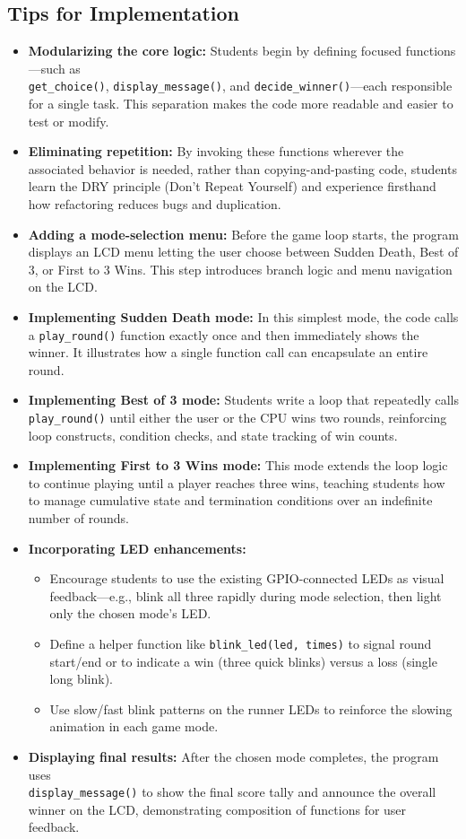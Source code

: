 \documentclass[a4paper,11pt]{article}
\begin{document}
\subsection*{Tips for Implementation}
\begin{itemize}
  \item \textbf{Modularizing the core logic:} Students begin by defining focused functions—such as \\ \texttt{get\_choice()}, \texttt{display\_message()}, and \texttt{decide\_winner()}—each responsible for a single task. This separation makes the code more readable and easier to test or modify.
  \item \textbf{Eliminating repetition:} By invoking these functions wherever the associated behavior is needed, rather than copying-and-pasting code, students learn the DRY principle (Don't Repeat Yourself) and experience firsthand how refactoring reduces bugs and duplication.
  \item \textbf{Adding a mode-selection menu:} Before the game loop starts, the program displays an LCD menu letting the user choose between Sudden Death, Best of 3, or First to 3 Wins. This step introduces branch logic and menu navigation on the LCD.
  \item \textbf{Implementing Sudden Death mode:} In this simplest mode, the code calls a \texttt{play\_round()} function exactly once and then immediately shows the winner. It illustrates how a single function call can encapsulate an entire round.
  \item \textbf{Implementing Best of 3 mode:} Students write a loop that repeatedly calls \texttt{play\_round()} until either the user or the CPU wins two rounds, reinforcing loop constructs, condition checks, and state tracking of win counts.
  \item \textbf{Implementing First to 3 Wins mode:} This mode extends the loop logic to continue playing until a player reaches three wins, teaching students how to manage cumulative state and termination conditions over an indefinite number of rounds.
  \item \textbf{Incorporating LED enhancements:}
    \begin{itemize}
      \item Encourage students to use the existing GPIO-connected LEDs as visual feedback—e.g., blink all three rapidly during mode selection, then light only the chosen mode’s LED.
      \item Define a helper function like \texttt{blink\_led(led, times)} to signal round start/end or to indicate a win (three quick blinks) versus a loss (single long blink).
      \item Use slow/fast blink patterns on the runner LEDs to reinforce the slowing animation in each game mode.
    \end{itemize}
  \item \textbf{Displaying final results:} After the chosen mode completes, the program uses \\ \texttt{display\_message()} to show the final score tally and announce the overall winner on the LCD, demonstrating composition of functions for user feedback.
\end{itemize}
\end{document}
